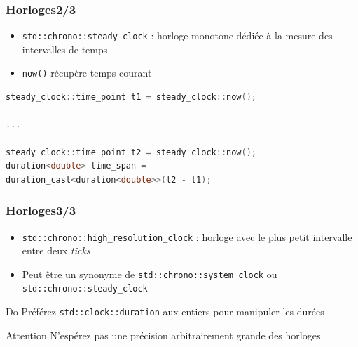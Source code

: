 \documentclass[C++.tex]{subfiles}
\begin{document}
\begin{frame}[fragile]
	\frametitle{Horloges\titlehfill{}2/3}
	\begin{itemize}
		\item \lstinline|std::chrono::steady_clock| : horloge monotone dédiée à la mesure des intervalles de temps


		\item \lstinline|now()| récupère temps courant
	\end{itemize}

	\begin{lstlisting}[language=C++]
steady_clock::time_point t1 = steady_clock::now();

...

steady_clock::time_point t2 = steady_clock::now();
duration<double> time_span = 
duration_cast<duration<double>>(t2 - t1);\end{lstlisting}
\end{frame}

\begin{frame}[fragile]
	\frametitle{Horloges\titlehfill{}3/3}
	\begin{itemize}
		\item \lstinline|std::chrono::high_resolution_clock| : horloge avec le plus petit intervalle entre deux \textit{ticks}
		\item Peut être un synonyme de \lstinline|std::chrono::system_clock| ou \lstinline|std::chrono::steady_clock|
	\end{itemize}

	\begin{exampleblock}{Do}
		Préférez \lstinline|std::clock::duration| aux entiers pour manipuler les durées

	\end{exampleblock}

	\begin{alertblock}{Attention}
		N'espérez pas une précision arbitrairement grande des horloges

	\end{alertblock}
\end{frame}
\end{document}
